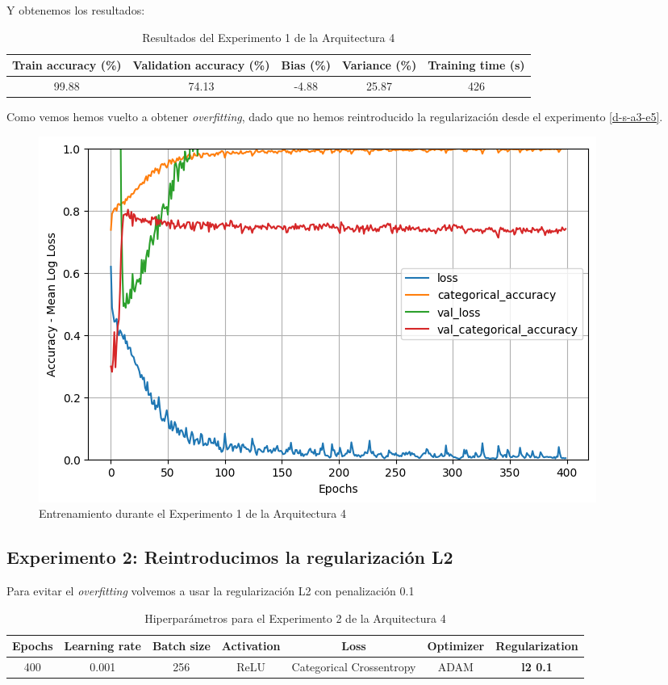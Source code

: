 \documentclass{article}
\begin{document}
			Y obtenemos los resultados:
			\begin{table}[!h]
				\begin{center}
					\begin{tabular}{| c | c | c | c | c |}
						\textbf{Train accuracy (\%)} & \textbf{Validation accuracy (\%)} & \textbf{Bias (\%)} & \textbf{Variance (\%)} & \textbf{Training time (s)} \\ \hline
						99.88 & 74.13 & -4.88 & 25.87 & 426 \\ \hline
					\end{tabular}
					\caption{Resultados del Experimento 1 de la Arquitectura 4}
					\label{tab:res-d-a4-e	}
				\end{center}
			\end{table}
			
			Como vemos hemos vuelto a obtener \textit{overfitting}, dado que no hemos reintroducido la regularizaci\'on desde el experimento \ref{d-s-a3-e5}.
			\begin{figure}[!h]
				\begin{center}
					\includegraphics[scale=0.5]{d-tr-a4-e1.png}		
					\caption{Entrenamiento durante el Experimento 1 de la Arquitectura 4}	
					\label{d-tr-a4-e1}
				\end{center}
			\end{figure}
			
		\subsection{Experimento 2: Reintroducimos la regularizaci\'on L2}
		\label{d-s-a4-e2}
			Para evitar el \textit{overfitting} volvemos a usar la regularizaci\'on L2 con penalizaci\'on 0.1
			\begin{table}[!h]
				\begin{tabular}{| c | c | c | c | c | c | c |}
					\textbf{Epochs} & \textbf{Learning rate} & \textbf{Batch size} & \textbf{Activation} & \textbf{Loss} & \textbf{Optimizer} & \textbf{Regularization} \\ \hline
					400 & 0.001 & 256 & ReLU & Categorical Crossentropy & ADAM & \textbf{l2 0.1}
				\end{tabular}
				\caption{Hiperpar\'ametros para el Experimento 2 de la Arquitectura 4}
				\label{tab:hip-d-a4-e2}
			\end{table}
			
\end{document}
